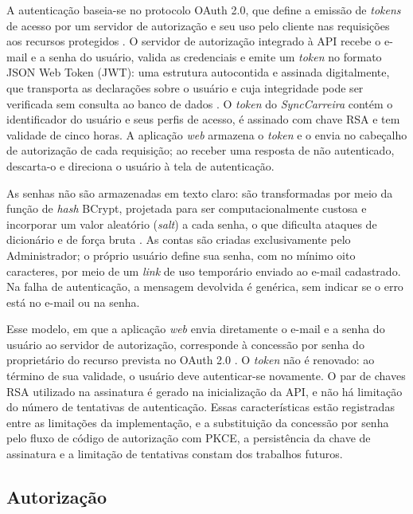 A autenticação baseia-se no protocolo OAuth 2.0, que define a emissão de \textit{tokens} de acesso por um servidor de autorização e seu uso pelo cliente nas requisições aos recursos protegidos \cite{hardt2012rfc6749}. O servidor de autorização integrado à API recebe o e-mail e a senha do usuário, valida as credenciais e emite um \textit{token} no formato JSON Web Token (JWT): uma estrutura autocontida e assinada digitalmente, que transporta as declarações sobre o usuário e cuja integridade pode ser verificada sem consulta ao banco de dados \cite{jones2015rfc7519}. O \textit{token} do \textit{SyncCarreira} contém o identificador do usuário e seus perfis de acesso, é assinado com chave RSA e tem validade de cinco horas. A aplicação \textit{web} armazena o \textit{token} e o envia no cabeçalho de autorização de cada requisição; ao receber uma resposta de não autenticado, descarta-o e direciona o usuário à tela de autenticação.

As senhas não são armazenadas em texto claro: são transformadas por meio da função de \textit{hash} BCrypt, projetada para ser computacionalmente custosa e incorporar um valor aleatório (\textit{salt}) a cada senha, o que dificulta ataques de dicionário e de força bruta \cite{provos1999}. As contas são criadas exclusivamente pelo Administrador; o próprio usuário define sua senha, com no mínimo oito caracteres, por meio de um \textit{link} de uso temporário enviado ao e-mail cadastrado. Na falha de autenticação, a mensagem devolvida é genérica, sem indicar se o erro está no e-mail ou na senha.

Esse modelo, em que a aplicação \textit{web} envia diretamente o e-mail e a senha do usuário ao servidor de autorização, corresponde à concessão por senha do proprietário do recurso prevista no OAuth 2.0 \cite{hardt2012rfc6749}. O \textit{token} não é renovado: ao término de sua validade, o usuário deve autenticar-se novamente. O par de chaves RSA utilizado na assinatura é gerado na inicialização da API, e não há limitação do número de tentativas de autenticação. Essas características estão registradas entre as limitações da implementação, e a substituição da concessão por senha pelo fluxo de código de autorização com PKCE, a persistência da chave de assinatura e a limitação de tentativas constam dos trabalhos futuros.

\subsection{Autorização}

